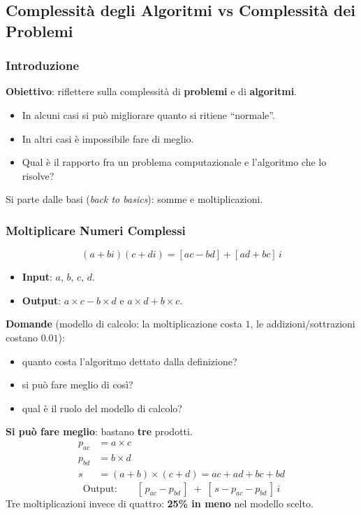 \documentclass[12pt, a4paper]{article}
\begin{document}
\subsection{Complessità degli Algoritmi vs Complessità dei Problemi}
\label{sec:complessita-problemi-algoritmi}

\subsubsection{Introduzione}

\textbf{Obiettivo}: riflettere sulla complessità di \textbf{problemi} e di \textbf{algoritmi}.
\begin{itemize}
    \item In alcuni casi si può migliorare quanto si ritiene ``normale''.
    \item In altri casi è impossibile fare di meglio.
    \item Qual è il rapporto fra un problema computazionale e l'algoritmo che lo risolve?
\end{itemize}
Si parte dalle basi (\textit{back to basics}): somme e moltiplicazioni.

\subsubsection{Moltiplicare Numeri Complessi}

\begin{tcolorbox}[colback=lightergray!10, colframe=tocsec, title=\textbf{Moltiplicazione di Numeri Complessi}]
$$(a+bi)(c+di) = [ac-bd] + [ad+bc]\,i$$
\begin{itemize}
    \item \textbf{Input}: $a,\,b,\,c,\,d$.
    \item \textbf{Output}: $a\times c - b\times d$ \quad e \quad $a\times d + b\times c$.
\end{itemize}
\end{tcolorbox}

\textbf{Domande} (modello di calcolo: la moltiplicazione costa $1$, le addizioni/sottrazioni costano $0.01$):
\begin{itemize}
    \item quanto costa l'algoritmo dettato dalla definizione?
    \item si può fare meglio di così?
    \item qual è il ruolo del modello di calcolo?
\end{itemize}

\textbf{Si può fare meglio}: bastano \textbf{tre} prodotti.
\begin{align*}
p_{ac} &= a\times c \\
p_{bd} &= b\times d \\
s &= (a+b)\times(c+d) = ac+ad+bc+bd
\end{align*}
$$\text{Output:}\qquad [\,p_{ac}-p_{bd}\,] \;+\; [\,s-p_{ac}-p_{bd}\,]\,i$$
Tre moltiplicazioni invece di quattro: \textcolor{green!50!black}{\textbf{25\% in meno}} nel modello scelto.
\end{document}
